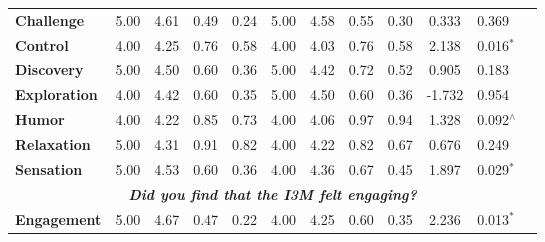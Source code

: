 \begin{table*}[b!]
\begin{tabular}{@{}cccccccccccclll@{}}
\multicolumn{1}{l|}{\textbf{Challenge}} &
  5.00 &
  4.61 &
  0.49 &
  \multicolumn{1}{c|}{0.24} &
  5.00 &
  4.58 &
  0.55 &
  \multicolumn{1}{c|}{0.30} &
  0.333 &
  \multicolumn{1}{l}{0.369} &
  \multicolumn{4}{c}{} \\
\multicolumn{1}{l|}{\textbf{Control}} &
  4.00 &
  4.25 &
  0.76 &
  \multicolumn{1}{c|}{0.58} &
  4.00 &
  4.03 &
  0.76 &
  \multicolumn{1}{c|}{0.58} &
  2.138 &
  \multicolumn{1}{l}{0.016$^\ast$} &
  \multicolumn{4}{c}{} \\
\multicolumn{1}{l|}{\textbf{Discovery}} &
  5.00 &
  4.50 &
  0.60 &
  \multicolumn{1}{c|}{0.36} &
  5.00 &
  4.42 &
  0.72 &
  \multicolumn{1}{c|}{0.52} &
  0.905 &
  \multicolumn{1}{l}{0.183} &
  \multicolumn{4}{c}{} \\
\multicolumn{1}{l|}{\textbf{Exploration}} &
  4.00 &
  4.42 &
  0.60 &
  \multicolumn{1}{c|}{0.35} &
  5.00 &
  4.50 &
  0.60 &
  \multicolumn{1}{c|}{0.36} &
  -1.732 &
  \multicolumn{1}{l}{0.954} &
  \multicolumn{4}{c}{} \\
\multicolumn{1}{l|}{\textbf{Humor}} &
  4.00 &
  4.22 &
  0.85 &
  \multicolumn{1}{c|}{0.73} &
  4.00 &
  4.06 &
  0.97 &
  \multicolumn{1}{c|}{0.94} &
  1.328 &
  \multicolumn{1}{l}{0.092$^\wedge$} &
  \multicolumn{4}{c}{} \\
\multicolumn{1}{l|}{\textbf{Relaxation}} &
  5.00 &
  4.31 &
  0.91 &
  \multicolumn{1}{c|}{0.82} &
  4.00 &
  4.22 &
  0.82 &
  \multicolumn{1}{c|}{0.67} &
  0.676 &
  \multicolumn{1}{l}{0.249} &
  \multicolumn{4}{c}{} \\
\multicolumn{1}{l|}{\textbf{Sensation}} &
  5.00 &
  4.53 &
  0.60 &
  \multicolumn{1}{c|}{0.36} &
  4.00 &
  4.36 &
  0.67 &
  \multicolumn{1}{c|}{0.45} &
  1.897 &
  \multicolumn{1}{l}{0.029$^\ast$} &
  \multicolumn{4}{c}{} \\ \midrule
\multicolumn{15}{c}{\textit{\textbf{Did you find that the I3M felt engaging?}}} \\ \midrule
\multicolumn{1}{l|}{\textbf{Engagement}} &
  5.00 &
  4.67 &
  0.47 &
  \multicolumn{1}{c|}{0.22} &
  4.00 &
  4.25 &
  0.60 &
  \multicolumn{1}{c|}{0.35} &
  2.236 &
  \multicolumn{1}{l}{0.013$^\ast$} &
  \multicolumn{4}{c}{} \\ \bottomrule
\end{tabular}
\end{table*}